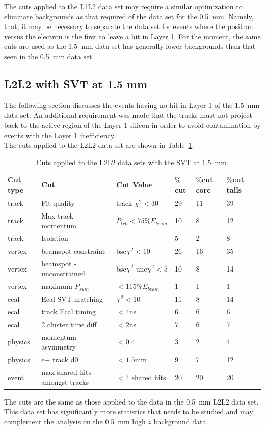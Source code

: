 The cuts applied to the L1L2 data set may require a similar optimization to eliminate backgrounds as that required of the data set for the 0.5~mm. Namely, that, it may be necessary to separate the data set for events where the positron versus the electron is the first to leave a hit in Layer 1. For the moment, the same cuts are used as the 1.5~mm data set has generally lower backgrounds than that seen in the 0.5~mm data set.

\subsection{L2L2 with SVT at 1.5 mm}
The following section discusses the events having no hit in Layer 1 of the 1.5~mm data set. An additional requirement was made that the tracks must not project back to the active region of the Layer 1 silicon in order to avoid contamination by events with the Layer 1 inefficiency. \\
\indent The cuts applied to the L2L2 data set are shown in Table~\ref{l2l2_cuts_1p5}.

\begin{table}[H]
\caption{Cuts applied to the L2L2 data sets with the SVT at 1.5~mm.}
\label{l2l2_cuts_1p5}
\centering
\begin{tabular}{lllllll}
\toprule
Cut type & Cut & Cut Value &  $\%$cut &  $\%$cut core & $\%$cut tails\\
\midrule
track & Fit quality & track $\chi^{2}<30$ & 29 & 11 & 39 \\
track & Max track momentum &  $P_{trk}<75\%E_{beam}$ & 10 & 8 & 12 \\
track & Isolation &   & 5 & 2 & 8 \\
vertex & beamspot constraint & bsc$\chi^{2}<10$  & 26 & 16 & 35 \\
vertex & beamspot - unconstrained & bsc$\chi^{2}$-unc$\chi^2<5$  & 10 & 8 & 14 \\
vertex & maximum $P_{sum}$ &  $<115\%E_{beam}$ & 1 & 1 & 1 \\
ecal & Ecal SVT matching & $\chi^2<10$  & 11 & 8 & 14 \\
ecal & track Ecal timing & $<4$ns  & 6 & 6 & 6 \\
ecal & 2 cluster time diff & $<2$ns  & 7 & 6 & 7 \\
physics & momentum asymmetry & $<0.4$  & 3 & 2 & 4 \\
physics & e+ track d0 & $<1.5$mm  & 9 & 7 & 12 \\
event & max shared hits amongst tracks & $<4$ shared hits  & 20 & 20 & 20 \\
\bottomrule
\end{tabular}
\end{table}

The cuts are the same as those applied to the data in the 0.5~mm L2L2 data set. This data set has significantly more statistics that needs to be studied and may complement the analysis on the 0.5~mm high $z$ background data. 